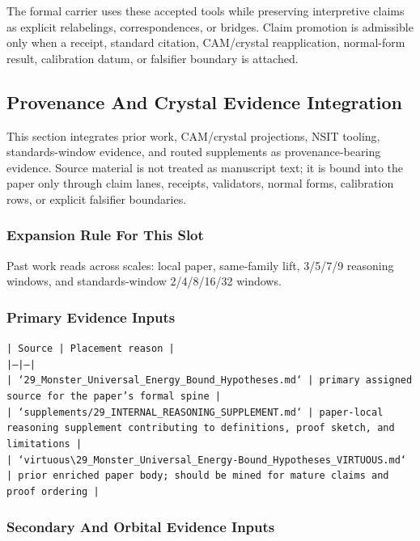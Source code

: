 \documentclass[11pt]{article}
\begin{document}
The formal carrier uses these accepted tools while preserving interpretive
claims as explicit relabelings, correspondences, or bridges. Claim promotion is admissible only when a receipt, standard citation,
CAM/crystal reapplication, normal-form result, calibration datum, or falsifier
boundary is attached.

\subsection*{Provenance And Crystal Evidence Integration}

This section integrates prior work, CAM/crystal projections, NSIT tooling,
standards-window evidence, and routed supplements as provenance-bearing
evidence. Source material is not treated as manuscript text; it is bound into
the paper only through claim lanes, receipts, validators, normal forms,
calibration rows, or explicit falsifier boundaries.

\subsubsection*{Expansion Rule For This Slot}

Past work reads across scales: local paper, same-family lift, 3/5/7/9 reasoning windows, and standards-window 2/4/8/16/32 windows.

\subsubsection*{Primary Evidence Inputs}

\noindent\texttt{| Source | Placement reason |}\\
\noindent\texttt{|---|---|}\\
\noindent\texttt{| `29\_Monster\_Universal\_Energy\_Bound\_Hypotheses.md` | primary assigned source for the paper's formal spine |}\\
\noindent\texttt{| `supplements/29\_INTERNAL\_REASONING\_SUPPLEMENT.md` | paper-local reasoning supplement contributing to definitions, proof sketch, and limitations |}\\
\noindent\texttt{| `virtuous\textbackslash{}29\_Monster\_Universal\_Energy-Bound\_Hypotheses\_VIRTUOUS.md` | prior enriched paper body; should be mined for mature claims and proof ordering |}\\

\subsubsection*{Secondary And Orbital Evidence Inputs}
\end{document}
